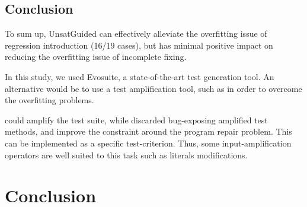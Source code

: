 \subsection{Conclusion}
\label{subsec:transversal-contributions:test-for-repair:conclusion}

To sum up, UnsatGuided can effectively alleviate the overfitting issue of regression introduction (16/19 cases), but has minimal positive impact on reducing the overfitting issue of incomplete fixing.

In this study, we used Evosuite, a state-of-the-art test generation tool.
An alternative would be to use a test amplification tool, such as \dspot in order to overcome the overfitting problems.

\dspot could amplify the test suite, while discarded bug-exposing amplified test methods, and improve the constraint around the program repair problem.
This can be implemented as a specific test-criterion.
Thus, some input-amplification operators are well suited to this task such as literals modifications.

\section{Conclusion}
\label{sec:transversal-contributions:conclusion}